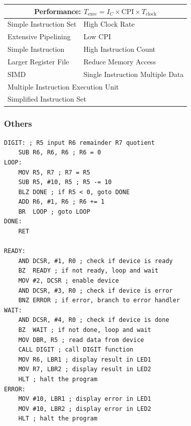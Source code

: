 \documentclass[10pt]{article}
\begin{document}
\begin{multicols*}{2}
\begin{tcolorbox}[title=Processor]
        \begin{tabular}{ll}
            \multicolumn{2}{c}{Performance: $T_{\text{exec}} = I_{C} \times \text{CPI} \times T_{\text{clock}}$} \\
            \hline
            Simple Instruction Set & High Clock Rate                                                             \\
            Extensive Pipelining   & Low CPI                                                                     \\
            Simple Instruction     & High Instruction Count                                                      \\
            \hline
            Larger Register File   & Reduce Memory Access                                                        \\
            SIMD                   & Single Instruction Multiple Data                                            \\
            \multicolumn{2}{l}{Multiple Instruction Execution Unit}                                              \\
            \multicolumn{2}{l}{Simplified Instruction Set}                                                       \\
        \end{tabular}
    \end{tcolorbox}

    \subsubsection*{Others}
    \begin{tcolorbox}[title=Programming I/O Assembly Framework]
        \begin{verbatim}
DIGIT: ; R5 input R6 remainder R7 quotient
    SUB R6, R6, R6 ; R6 = 0
LOOP:
    MOV R5, R7 ; R7 = R5
    SUB R5, #10, R5 ; R5 -= 10
    BLZ DONE ; if R5 < 0, goto DONE
    ADD R6, #1, R6 ; R6 += 1
    BR  LOOP ; goto LOOP
DONE:
    RET

READY:
    AND DCSR, #1, R0 ; check if device is ready
    BZ  READY ; if not ready, loop and wait
    MOV #2, DCSR ; enable device
    AND DCSR, #3, R0 ; check if device is error
    BNZ ERROR ; if error, branch to error handler
WAIT:
    AND DCSR, #4, R0 ; check if device is done
    BZ  WAIT ; if not done, loop and wait
    MOV DBR, R5 ; read data from device
    CALL DIGIT ; call DIGIT function
    MOV R6, LBR1 ; display result in LED1
    MOV R7, LBR2 ; display result in LED2
    HLT ; halt the program
ERROR:
    MOV #10, LBR1 ; display error in LED1
    MOV #10, LBR2 ; display error in LED2
    HLT ; halt the program
        \end{verbatim}
    \end{tcolorbox}


\end{multicols*}
\end{document}
